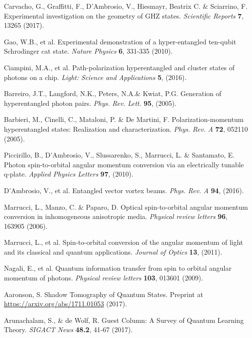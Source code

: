 \documentclass[aps,superscriptaddress,nofootinbib,twocolumn]{revtex4-1}
\begin{document}
\begin{thebibliography}{9}
Carvacho, G., Graffitti, F., D'Ambrosio, V.,  Hiesmayr, Beatrix C. \& Sciarrino, F.
Experimental investigation on the geometry of GHZ states.
\textit{Scientific Reports} \textbf{7}, 13265 (2017).

 Gao, W.B., et al.
Experimental demonstration of a hyper-entangled ten-qubit Schrodinger cat state.
\textit{Nature Physics} \textbf{6}, 331-335 (2010).

 Ciampini, M.A., et al.
Path-polarization hyperentangled and cluster states of photons on a chip.
\textit{Light: Science and Applications} \textbf{5}, (2016).

 Barreiro, J.T., Langford, N.K., Peters, N.A.\& Kwiat, P.G. 
Generation of hyperentangled photon pairs.
\textit{Phys. Rev. Lett.} \textbf{95}, (2005).

 Barbieri, M., Cinelli, C., Mataloni, P. \& De Martini, F. 
Polarization-momentum hyperentangled states: Realization and characterization.
\textit{Phys. Rev. A} \textbf{72}, 052110 (2005).

Piccirillo, B., D'Ambrosio, V., Slussarenko, S., Marrucci, L. \& Santamato, E.
Photon spin-to-orbital angular momentum conversion via an electrically tunable q-plate.
\textit{Applied Physics Letters} \textbf{97}, (2010).

D'Ambrosio, V., et al.
Entangled vector vortex beams.
\textit{Phys. Rev. A} \textbf{94}, (2016). 

Marrucci, L., Manzo, C. \& Paparo, D.
Optical spin-to-orbital angular momentum conversion in inhomogeneous anisotropic media.
\textit{Physical review letters} \textbf{96}, 163905 (2006).

 Marrucci, L., et al.
Spin-to-orbital conversion of the angular momentum of light and its classical and quantum applications.
\textit{Journal of Optics} \textbf{13}, (2011).

Nagali, E., et al.
Quantum information transfer from spin to orbital angular momentum of photons.
\textit{Physical review letters}
\textbf{103}, 013601 (2009).

 Aaronson, S.
Shadow Tomography of Quantum States. 
Preprint at \href{https://arxiv.org/abs/1711.01053}{https://arxiv.org/abs/1711.01053} (2017).

 Arunachalam, S., \& de Wolf, R.
Guest Column: A Survey of Quantum Learning Theory. \textit{SIGACT News} \textbf{48.2}, 41-67 (2017).



\end{thebibliography}
\end{document}
